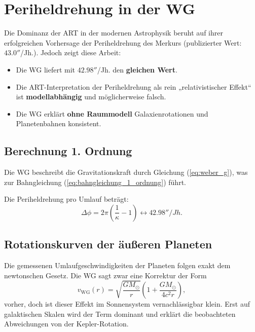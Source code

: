 \section{Periheldrehung in der WG}
Die Dominanz der ART in der modernen Astrophysik beruht auf ihrer erfolgreichen Vorhersage der Periheldrehung des Merkurs \cite{einstein1915} (publizierter Wert: $43.0''$/Jh.). Jedoch zeigt diese Arbeit:
\begin{itemize}
    \item Die WG liefert mit $42.98''$/Jh. den \textbf{gleichen Wert}.
    \item Die ART-Interpretation der Periheldrehung als rein „relativistischer Effekt“ ist \textbf{modellabhängig} und möglicherweise falsch.
    \item Die WG erklärt \textbf{ohne Raummodell} Galaxienrotationen und Planetenbahnen konsistent.
\end{itemize}

\subsection{Berechnung 1. Ordnung}
Die WG beschreibt die Gravitationskraft durch Gleichung (\ref{eq:weber_g}), was zur Bahngleichung (\ref{eq:bahngleichung_1_ordnung}) führt.

Die Periheldrehung pro Umlauf beträgt:
\begin{equation}
\Delta\phi = 2\pi\left(\frac{1}{\kappa} - 1\right) \leftrightarrow 42.98'' /Jh.
\end{equation}

\subsection{Rotationskurven der äußeren Planeten}
Die gemessenen Umlaufgeschwindigkeiten der Planeten folgen exakt dem newtonschen Gesetz. Die WG sagt zwar eine Korrektur der Form
\[
v_{\text{WG}}(r) = \sqrt{\frac{GM_\odot}{r}} \left(1 + \frac{GM_\odot}{4c^2 r}\right),
\]
vorher, doch ist dieser Effekt im Sonnensystem vernachlässigbar klein. Erst auf galaktischen Skalen wird der Term dominant und
erklärt die beobachteten Abweichungen von der Kepler-Rotation.
